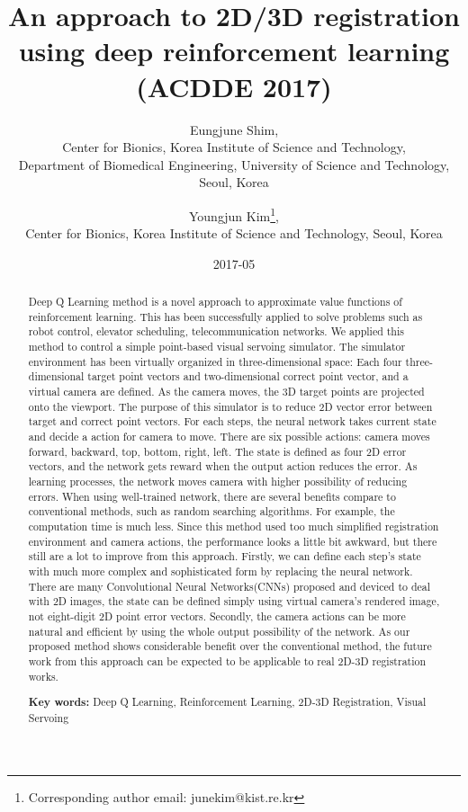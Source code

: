 \documentclass[10pt]{article}
\begin{document}
\title{An approach to 2D/3D registration using deep reinforcement learning \\(ACDDE 2017)}

\author{Eungjune Shim, \\
Center for Bionics, Korea Institute of Science and Technology, \\
Department of Biomedical Engineering, University of Science and Technology, Seoul, Korea
\and Youngjun Kim\thanks{Corresponding author email: junekim@kist.re.kr},
\\ Center for Bionics, Korea Institute of Science and Technology, Seoul, Korea}


%

\date{2017-05}
\maketitle

\begin{abstract}
 Deep Q Learning method is a novel approach to approximate value functions of reinforcement learning. This has been successfully applied to solve problems such as robot control, elevator scheduling, telecommunication networks. We applied this method to control a simple point-based visual servoing simulator. The simulator environment has been virtually organized in three-dimensional space: Each four three-dimensional target point vectors and two-dimensional correct point vector, and a virtual camera are defined. As the camera moves, the 3D target points are projected onto the viewport. The purpose of this simulator is to reduce 2D vector error between target and correct point vectors. For each steps, the neural network takes current state and decide a action for camera to move. There are six possible actions: camera moves forward, backward, top, bottom, right, left. The state is defined as four 2D error vectors, and the network gets reward when the output action reduces the error. As learning processes, the network moves camera with higher possibility of reducing errors. When using well-trained network, there are several benefits compare to conventional methods, such as random searching algorithms. For example, the computation time is much less. Since this method used too much simplified registration environment and camera actions, the performance looks a little bit awkward, but there still are a lot to improve from this approach. Firstly, we can define each step's state with much more complex and sophisticated form by replacing the neural network. There are many Convolutional Neural Networks(CNNs) proposed and deviced to deal with 2D images, the state can be defined simply using virtual camera's rendered image, not eight-digit 2D point error vectors. Secondly, the camera actions can be more natural and efficient by using the whole output possibility of the network. As our proposed method shows considerable benefit over the conventional method, the future work from this approach can be expected to be applicable to real 2D-3D registration works.

\vspace*{5mm}
\noindent
{\bf Key words:}  Deep Q Learning, Reinforcement Learning, 2D-3D Registration, Visual Servoing
\end{abstract}
\end{document}
